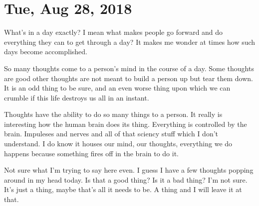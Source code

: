 \section{Tue, Aug 28, 2018}

What's in a day exactly? I mean what makes people go forward and do everything they
can to get through a day? It makes me wonder at times how such days become
accomplished.

So many thoughts come to a person's mind in the course of a day. Some thoughts are
good other thoughts are not meant to build a person up but tear them down. It is an
odd thing to be sure, and an even worse thing upon which we can crumble if this life
destroys us all in an instant.

Thoughts have the ability to do so many things to a person. It really is interesting
how the human brain does its thing. Everything is controlled by the brain. Impuleses
and nerves and all of that sciency stuff which I don't understand. I do know it
houses our mind, our thoughts, everything we do happens because something fires off
in the brain to do it.

Not sure what I'm trying to say here even. I guess I have a few thoughts popping
around in my head today. Is that a good thing? Is it a bad thing? I'm not sure. It's
just a thing, maybe that's all it needs to be. A thing and I will leave it at that.